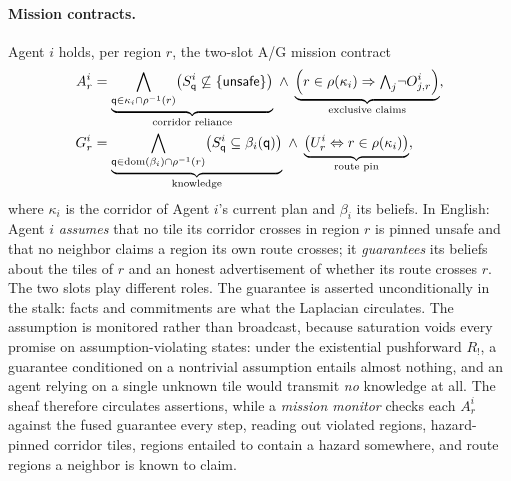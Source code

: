 \documentclass[10pt]{article}
\newcommand{\tile}{\mathsf{q}}
\theoremstyle{definition}
\theoremstyle{remark}
\begin{document}
\paragraph{Mission contracts.}
Agent $i$ holds, per region $r$, the two-slot A/G mission contract
\begin{align}
\label{eq:mission}
A^i_r &= \underbrace{\bigwedge_{\tile \in \kappa_i \cap \rho^{-1}(r)} \bigl(S^i_\tile \not\subseteq \{\mathsf{unsafe}\}\bigr)}_{\text{corridor reliance}} \;\wedge\; \underbrace{\Bigl(r \in \rho(\kappa_i) \Rightarrow {\textstyle\bigwedge_{j}} \neg O^i_{j,r}\Bigr)}_{\text{exclusive claims}},\\
G^i_r &= \underbrace{\bigwedge_{\tile \in \mathrm{dom}(\beta_i) \cap \rho^{-1}(r)} \bigl(S^i_\tile \subseteq \beta_i(\tile)\bigr)}_{\text{knowledge}} \;\wedge\; \underbrace{\bigl(U^i_r \Leftrightarrow r \in \rho(\kappa_i)\bigr)}_{\text{route pin}},\nonumber
\end{align}
where $\kappa_i$ is the corridor of Agent $i$'s current plan and $\beta_i$ its beliefs. In English: Agent $i$ \emph{assumes} that no tile its corridor crosses in region $r$ is pinned unsafe and that no neighbor claims a region its own route crosses; it \emph{guarantees} its beliefs about the tiles of $r$ and an honest advertisement of whether its route crosses $r$.
The two slots play different roles. The guarantee is asserted unconditionally in the stalk: facts and commitments are what the Laplacian circulates. The assumption is monitored rather than broadcast, because saturation voids every promise on assumption-violating states: under the existential pushforward $R_{!}$, a guarantee conditioned on a nontrivial assumption entails almost nothing, and an agent relying on a single unknown tile would transmit \emph{no} knowledge at all. The sheaf therefore circulates assertions, while a \emph{mission monitor} checks each $A^i_r$ against the fused guarantee every step, reading out violated regions, hazard-pinned corridor tiles, regions entailed to contain a hazard somewhere, and route regions a neighbor is known to claim.
\end{document}
